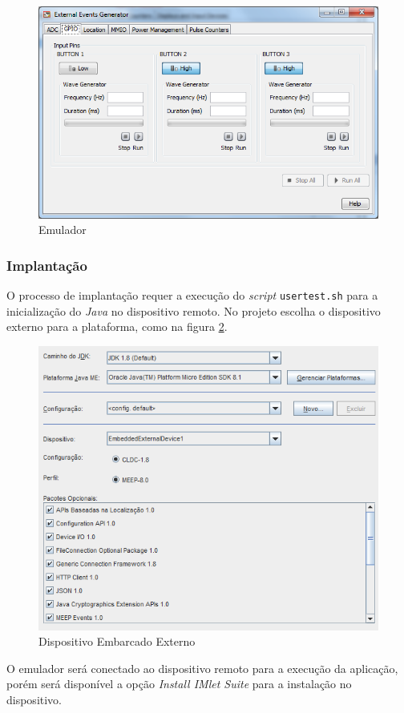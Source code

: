 \begin{figure}[H]
    \centering
    \includegraphics[width=0.7\linewidth]{figuras/java/java-me-external-events-generator.png}
    \caption{Emulador}
    \label{fig:java-me/external-events-generator}
\end{figure}

\subsubsection{Implantação}

O processo de implantação requer a execução do \textit{script} 
\verb|usertest.sh| para a inicialização do \textit{Java} no dispositivo remoto.
No projeto escolha o dispositivo externo para a plataforma, como na figura 
\ref{fig:java-me/plataform}.

\begin{figure}[H]
    \centering
    \includegraphics[width=0.7\linewidth]{figuras/java/java-me-plataform.png}
    \caption{Dispositivo Embarcado Externo}
    \label{fig:java-me/plataform}
\end{figure}

O emulador será conectado ao dispositivo remoto para a execução da aplicação, 
porém será disponível a opção \textit{Install IMlet Suite} para a instalação no 
dispositivo.

